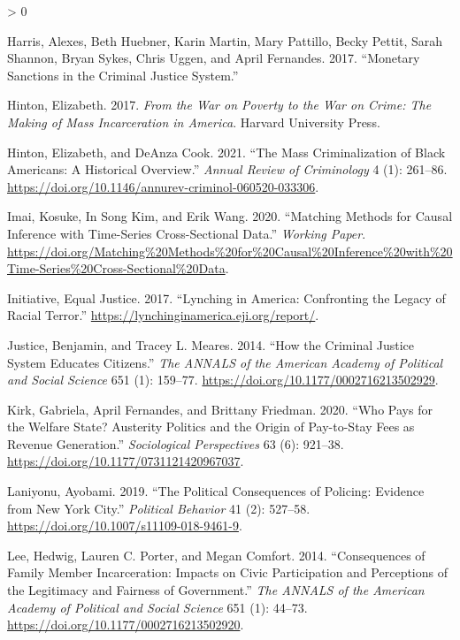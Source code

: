 \documentclass[
  12pt,
]{article}
\newlength{\cslhangindent}
\newenvironment{CSLReferences}[2] %
 {%
  \setlength{\parindent}{0pt}
  \ifodd #1 \everypar{\setlength{\hangindent}{\cslhangindent}}\ignorespaces\fi
  \ifnum #2 > 0
  \setlength{\parskip}{#2\baselineskip}
  \fi
 }%
 {}
\begin{document}
\begin{CSLReferences}{1}{0}
\leavevmode\hypertarget{ref-Harris2017}{}%
Harris, Alexes, Beth Huebner, Karin Martin, Mary Pattillo, Becky Pettit, Sarah Shannon, Bryan Sykes, Chris Uggen, and April Fernandes. 2017. {``Monetary {Sanctions} in the {Criminal Justice System}.''}

\leavevmode\hypertarget{ref-Hinton2017}{}%
Hinton, Elizabeth. 2017. \emph{From the {War} on {Poverty} to the {War} on {Crime}: {The Making} of {Mass Incarceration} in {America}}. {Harvard University Press}.

\leavevmode\hypertarget{ref-Hinton2021}{}%
Hinton, Elizabeth, and DeAnza Cook. 2021. {``The {Mass Criminalization} of {Black Americans}: {A Historical Overview}.''} \emph{Annual Review of Criminology} 4 (1): 261--86. \url{https://doi.org/10.1146/annurev-criminol-060520-033306}.

\leavevmode\hypertarget{ref-Imai2020}{}%
Imai, Kosuke, In Song Kim, and Erik Wang. 2020. {``Matching {Methods} for {Causal Inference} with {Time}-{Series Cross}-{Sectional Data}.''} \emph{Working Paper}. \url{https://doi.org/Matching\%20Methods\%20for\%20Causal\%20Inference\%20with\%20Time-Series\%20Cross-Sectional\%20Data}.

\leavevmode\hypertarget{ref-EqualJusticeInitiative2017}{}%
Initiative, Equal Justice. 2017. {``Lynching in {America}: {Confronting} the {Legacy} of {Racial Terror}.''} \url{https://lynchinginamerica.eji.org/report/}.

\leavevmode\hypertarget{ref-Justice2014}{}%
Justice, Benjamin, and Tracey L. Meares. 2014. {``How the {Criminal Justice System Educates Citizens}.''} \emph{The ANNALS of the American Academy of Political and Social Science} 651 (1): 159--77. \url{https://doi.org/10.1177/0002716213502929}.

\leavevmode\hypertarget{ref-Kirk2020}{}%
Kirk, Gabriela, April Fernandes, and Brittany Friedman. 2020. {``Who {Pays} for the {Welfare State}? {Austerity Politics} and the {Origin} of {Pay}-to-{Stay Fees} as {Revenue Generation}.''} \emph{Sociological Perspectives} 63 (6): 921--38. \url{https://doi.org/10.1177/0731121420967037}.

\leavevmode\hypertarget{ref-Laniyonu2019}{}%
Laniyonu, Ayobami. 2019. {``The {Political Consequences} of {Policing}: {Evidence} from {New York City}.''} \emph{Political Behavior} 41 (2): 527--58. \url{https://doi.org/10.1007/s11109-018-9461-9}.

\leavevmode\hypertarget{ref-Lee2014}{}%
Lee, Hedwig, Lauren C. Porter, and Megan Comfort. 2014. {``Consequences of {Family Member Incarceration}: {Impacts} on {Civic Participation} and {Perceptions} of the {Legitimacy} and {Fairness} of {Government}.''} \emph{The ANNALS of the American Academy of Political and Social Science} 651 (1): 44--73. \url{https://doi.org/10.1177/0002716213502920}.


\end{CSLReferences}
\end{document}

